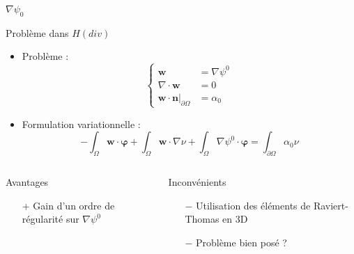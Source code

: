 \documentclass{beamer}
\newcommand{\grad}{{\nabla}}
\renewcommand{\div}{{\nabla\cdot}}
\newcommand{\restr}{{\big\rvert_{\partial\Omega}}}
\begin{document}
\begin{frame}{$\grad\psi_0$}
\begin{block}{Problème dans $ H(div)$}
\begin{itemize}
\item Problème :
\[\left\{\begin{aligned}
\mathbf{w} &= \grad \psi^0\\
\div\mathbf{w} &= 0\\
\mathbf{w}\cdot \mathbf{n}\restr &= \alpha_0
\end{aligned}\right.\]
\item Formulation variationnelle :
\[ -\int_\Omega \mathbf{w}\cdot\bm{\varphi} + \int_\Omega \mathbf{w}\cdot\grad\nu + \int_\Omega \grad\psi^0\cdot\bm{\varphi}  = \int_{\partial\Omega} \alpha_0\nu \]
\end{itemize}
\end{block}
\begin{columns}[t]
\begin{column}{5cm}
\begin{exampleblock}{Avantages}
\begin{itemize}
\item[+] Gain d'un ordre de régularité sur $\grad\psi^0$
\end{itemize}
\end{exampleblock}
\end{column}
\begin{column}{5cm}
\begin{alertblock}{Inconvénients}
\begin{itemize}
\item[$-$] Utilisation des éléments de Raviert-Thomas en 3D
\item[$-$] Problème bien posé ?
\end{itemize}
\end{alertblock}
\end{column}
\end{columns}
\end{frame}
\end{document}
